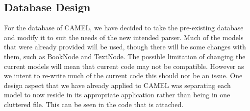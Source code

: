\subsection*{Database Design}
	For the database of CAMEL, we have decided to take the pre-existing database and modify it to suit the needs of the new intended parser. Much of the models that were already provided will be used, though there will be some changes with them, such as BookNode and TextNode. The possible limitation of changing the current models will mean that current code may not be compatible. However as we intent to re-write much of the current code this should not be an issue. One design aspect that we have already applied to CAMEL was separating each model to now reside in its appropriate application rather than being in one cluttered file. This can be seen in the code that is attached.\\ 
	
